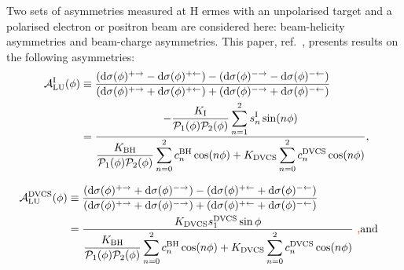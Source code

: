 Two sets of asymmetries measured at H{\sc
ermes} with an unpolarised target and a polarised electron or positron
beam are considered here:
beam-helicity asymmetries and beam-charge asymmetries. This paper,  ref.~\cite{Air09}, presents results on the following asymmetries:
\begin{align}
\hspace{0.5cm}\mathcal{A}^{\textrm{I}}_{\textrm{LU}}(\phi) &\equiv
\frac{(\textrm{d}\sigma(\phi)^{+\rightarrow} -
\textrm{d}\sigma(\phi)^{+\leftarrow}) -
(\textrm{d}\sigma(\phi)^{-\rightarrow}
- \textrm{d}\sigma(\phi)^{-\leftarrow})}{(\textrm{d}\sigma(\phi)^{+\rightarrow}
+
\textrm{d}\sigma(\phi)^{+\leftarrow}) +
(\textrm{d}\sigma(\phi)^{-\rightarrow}
+ \textrm{d}\sigma(\phi)^{-\leftarrow})}&  \nonumber \\
&=\dfrac{-\dfrac{K_{\textrm{I}}}{\mathcal{P}_{1}(\phi)\mathcal{P}_{2}(\phi)}
\displaystyle\sum_{n=1}^2
s_{n}^{\textrm{I}}\sin(n\phi)}{\dfrac{K_{\textrm{BH}}}{\mathcal{P}_{1}
(\phi)\mathcal{P}_{
2}(\phi)}
\displaystyle\sum_{n=0}^2
c_{n}^{\textrm{BH}}\cos(n\phi) + 
K_{\textrm{DVCS}}\displaystyle\sum_{n=0}^2 c_{n}^{\textrm{DVCS}}\cos(n\phi)},& 
\label{e:alui}
\end{align}

\begin{align}
\mathcal{A}^{\textrm{DVCS}}_{\textrm{LU}}(\phi) &\equiv
\frac{(\textrm{d}\sigma(\phi)^{+\rightarrow} +
\textrm{d}\sigma(\phi)^{-\rightarrow}) -
(\textrm{d}\sigma(\phi)^{+\leftarrow} + 
\textrm{d}\sigma(\phi)^{-\leftarrow})}
{(\textrm{d}\sigma(\phi)^{+\rightarrow} +
\textrm{d}\sigma(\phi)^{-\rightarrow}) +
(\textrm{d}\sigma(\phi)^{+\leftarrow}
+ \textrm{d}\sigma(\phi)^{-\leftarrow})}&  \nonumber \\
&=\dfrac{K_{\textrm{DVCS}}
s_{1}^{\textrm{DVCS}}\sin\phi}{\dfrac{K_{\textrm{BH}}}{\mathcal{P}_{1}
(\phi)\mathcal{P}_{2}(\phi)}
\displaystyle\sum_{n=0}^2
c_{n}^{\textrm{BH}}\cos(n\phi) + 
K_{\textrm{DVCS}}\displaystyle\sum_{n=0}^2
c_{n}^{\textrm{DVCS}}\cos(n\phi)} \textrm{\,\,{\color{red}{,}\color{black}}and}&
\label{e:aludvcs}
\end{align}

